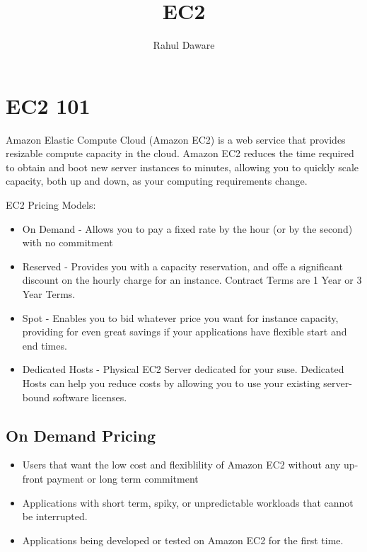 \documentclass{article}
\author{Rahul Daware}
\begin{document}
\title{EC2}
\maketitle
\newpage
\tableofcontents
\newpage

\section{EC2 101}
Amazon Elastic Compute Cloud (Amazon EC2) is a web service that provides resizable compute capacity in the cloud. Amazon EC2 reduces the time required to obtain and boot new server instances to minutes, allowing you to quickly scale capacity, both up and down, as your computing requirements change.

EC2 Pricing Models:
\begin{itemize}
\item
On Demand - Allows you to pay a fixed rate by the hour (or by the second) with no commitment

\item
Reserved - Provides you with a capacity reservation, and offe a significant discount on the hourly charge for an instance. Contract Terms are 1 Year or 3 Year Terms.

\item
Spot - Enables you to bid whatever price you want for instance capacity, providing for even great savings if your applications have flexible start and end times.

\item
Dedicated Hosts - Physical EC2 Server dedicated for your suse. Dedicated Hosts can help you reduce costs by allowing  you to use your existing server-bound software licenses.
\end{itemize}

\subsection{On Demand Pricing}
\begin{itemize}
\item
Users that want the low cost and flexiblility of Amazon EC2 without any up-front payment or long term commitment

\item
Applications with short term, spiky, or unpredictable workloads that cannot be interrupted.

\item
Applications being developed or tested on Amazon EC2 for the first time.
\end{itemize}
\end{document}
